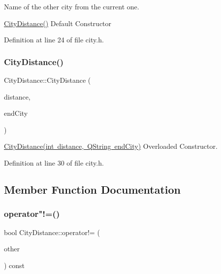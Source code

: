 Name of the other city from the current one. 

\mbox{\hyperlink{struct_city_distance_aa486f287fb876e7aec9d41340a9a2b62}{City\+Distance()}} Default Constructor 

Definition at line 24 of file city.\+h.

\mbox{\label{struct_city_distance_a5710d1d7374892efd201c4cd187d9e42}} 
\subsubsection{\texorpdfstring{CityDistance()}{CityDistance()}\hspace{0.1cm}{\footnotesize\ttfamily [2/2]}}
{\footnotesize\ttfamily City\+Distance\+::\+City\+Distance (\begin{DoxyParamCaption}\item[{int}]{distance,  }\item[{Q\+String}]{end\+City }\end{DoxyParamCaption})\hspace{0.3cm}{\ttfamily [inline]}}



\mbox{\hyperlink{struct_city_distance_a5710d1d7374892efd201c4cd187d9e42}{City\+Distance(int distance, Q\+String end\+City)}} Overloaded Constructor. 



Definition at line 30 of file city.\+h.



\subsection{Member Function Documentation}
\mbox{\label{struct_city_distance_ae56feb19d11926e9d3bc03b5abfc9b48}} 
\subsubsection{\texorpdfstring{operator"!=()}{operator!=()}}
{\footnotesize\ttfamily bool City\+Distance\+::operator!= (\begin{DoxyParamCaption}\item[{const \mbox{\hyperlink{struct_city_distance}{City\+Distance}} \&}]{other }\end{DoxyParamCaption}) const\hspace{0.3cm}{\ttfamily [inline]}}



